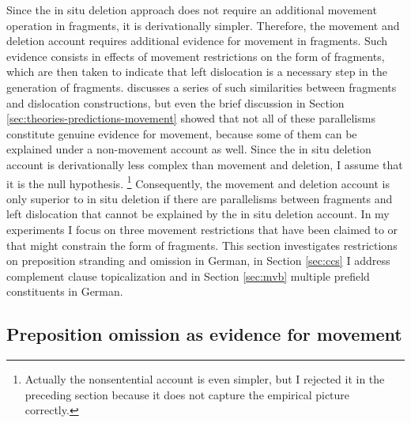 Since the in situ deletion approach does not require an additional movement operation in fragments, it is derivationally simpler. Therefore, the movement and deletion account requires additional evidence for movement in fragments. Such evidence consists in effects of movement restrictions on the form of fragments, which are then taken to indicate that left dislocation is a necessary step in the generation of fragments. \citet{merchant2004} discusses a series of such similarities between fragments and dislocation constructions, but even the brief discussion in Section \ref{sec:theories-predictions-movement} showed that not all of these parallelisms constitute genuine evidence for movement, because some of them can be explained under a non-movement account as well. Since the in situ deletion account is derivationally less complex than movement and deletion, I assume that it is the null hypothesis.%
%
\footnote{Actually the nonsentential account is even simpler, but I rejected it in the preceding section because it does not capture the empirical picture correctly.}\afterfn%
%
Consequently, the movement and deletion account is only superior to in situ deletion if there are parallelisms between fragments and left dislocation that cannot be explained by the in situ deletion account. In my experiments I focus on three movement restrictions that have been claimed to or that might constrain the form of fragments. This section investigates restrictions on preposition stranding and omission in German, in Section \ref{sec:ccs} I address complement clause topicalization and in Section \ref{sec:mvb} multiple prefield constituents in German.

\subsection{Preposition omission as evidence for movement}\label{sec:pstranding-background}
\largerpage[-1]

